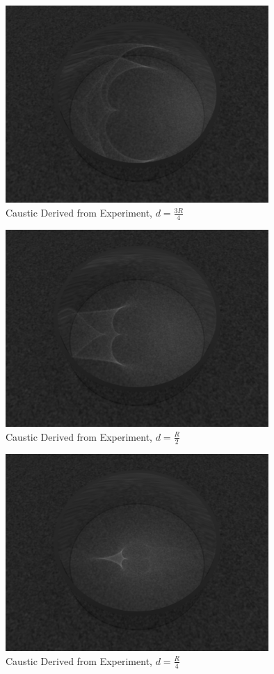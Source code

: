 \documentclass[a4paper]{article}
\begin{document}
       \begin{figure}[!htbp]
        \centering
        \includegraphics[width=10cm]{0002.png}
        \caption{Caustic Derived from Experiment, $d=\frac{3R}{4}$}
        \label{fig:caustic}
    \end{figure}
    
     \begin{figure}[!htbp]
        \centering
        \includegraphics[width=10cm]{0003.png}
        \caption{Caustic Derived from Experiment, $d=\frac{R}{2}$}
        \label{fig:caustic}
    \end{figure}
    
      \begin{figure}[!htbp]
        \centering
        \includegraphics[width=10cm]{0004.png}
        \caption{Caustic Derived from Experiment, $d=\frac{R}{4}$}
        \label{fig:caustic}
    \end{figure}
    
\end{document}
